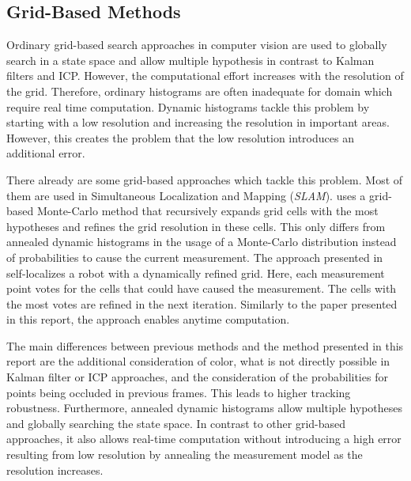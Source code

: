 \documentclass[twoside,a4paper,article]{combine}
\begin{document}
\subsection{Grid-Based Methods}
\label{sub:grid-based-methods}
Ordinary grid-based search approaches in computer vision are used to
globally search in a state space and allow multiple hypothesis in
contrast to Kalman filters and ICP. However, the computational
effort increases with the resolution of the grid. Therefore,
ordinary histograms are often inadequate for domain which require
real time computation.
Dynamic histograms tackle this problem by starting with a low
resolution and increasing the resolution in important areas. However,
this creates the problem that the low resolution introduces an
additional error.

There already are some grid-based approaches which tackle this
problem. Most of them are used in Simultaneous Localization and
Mapping (\textit{SLAM}). \cite{multi-res-grid-slam2} uses a grid-based
Monte-Carlo method that recursively expands grid cells with the
most hypotheses and refines the grid resolution in these cells. This
only differs from annealed dynamic histograms in the usage of a
Monte-Carlo distribution instead of probabilities to cause the current
measurement. The approach presented in~\cite{multi-res-grid-slam}
self-localizes a robot with a dynamically refined grid. Here, each
measurement point votes for the cells that could have caused the
measurement. The cells with the most votes are refined in the next
iteration. Similarly to the paper presented in this report, the
approach enables anytime computation.

The main differences between previous methods and the method presented
in this report are the additional consideration of color, what is not
directly possible in Kalman filter or ICP approaches, and the
consideration of the probabilities for points being occluded in
previous frames. This leads to higher tracking
robustness. Furthermore, annealed dynamic histograms allow multiple
hypotheses and globally
searching the state space. In contrast to other
grid-based approaches, it also allows real-time computation without
introducing a high error resulting from low resolution by
annealing the measurement model as the resolution increases.

\end{document}
